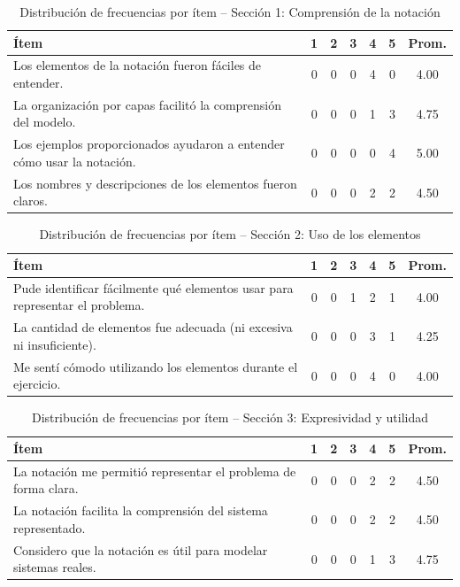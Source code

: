 \begin{table}[H]
\centering
\caption{Distribución de frecuencias por ítem -- Sección 1: Comprensión de la notación}
\label{tab:frecuencias_seccion1}
\begin{tabular}{|p{7cm}|c|c|c|c|c|c|}
\hline
\textbf{Ítem} & \textbf{1} & \textbf{2} & \textbf{3} & \textbf{4} & \textbf{5} & \textbf{Prom.} \\
\hline
Los elementos de la notación fueron fáciles de entender. & 0 & 0 & 0 & 4 & 0 & 4.00 \\
\hline
La organización por capas facilitó la comprensión del modelo. & 0 & 0 & 0 & 1 & 3 & 4.75 \\
\hline
Los ejemplos proporcionados ayudaron a entender cómo usar la notación. & 0 & 0 & 0 & 0 & 4 & 5.00 \\
\hline
Los nombres y descripciones de los elementos fueron claros. & 0 & 0 & 0 & 2 & 2 & 4.50 \\
\hline
\end{tabular}
\end{table}

\begin{table}[H]
\centering
\caption{Distribución de frecuencias por ítem -- Sección 2: Uso de los elementos}
\label{tab:frecuencias_seccion2}
\begin{tabular}{|p{7cm}|c|c|c|c|c|c|}
\hline
\textbf{Ítem} & \textbf{1} & \textbf{2} & \textbf{3} & \textbf{4} & \textbf{5} & \textbf{Prom.} \\
\hline
Pude identificar fácilmente qué elementos usar para representar el problema. & 0 & 0 & 1 & 2 & 1 & 4.00 \\
\hline
La cantidad de elementos fue adecuada (ni excesiva ni insuficiente). & 0 & 0 & 0 & 3 & 1 & 4.25 \\
\hline
Me sentí cómodo utilizando los elementos durante el ejercicio. & 0 & 0 & 0 & 4 & 0 & 4.00 \\
\hline
\end{tabular}
\end{table}

\begin{table}[H]
\centering
\caption{Distribución de frecuencias por ítem -- Sección 3: Expresividad y utilidad}
\label{tab:frecuencias_seccion3}
\begin{tabular}{|p{7cm}|c|c|c|c|c|c|}
\hline
\textbf{Ítem} & \textbf{1} & \textbf{2} & \textbf{3} & \textbf{4} & \textbf{5} & \textbf{Prom.} \\
\hline
La notación me permitió representar el problema de forma clara. & 0 & 0 & 0 & 2 & 2 & 4.50 \\
\hline
La notación facilita la comprensión del sistema representado. & 0 & 0 & 0 & 2 & 2 & 4.50 \\
\hline
Considero que la notación es útil para modelar sistemas reales. & 0 & 0 & 0 & 1 & 3 & 4.75 \\
\hline
\end{tabular}
\end{table}

